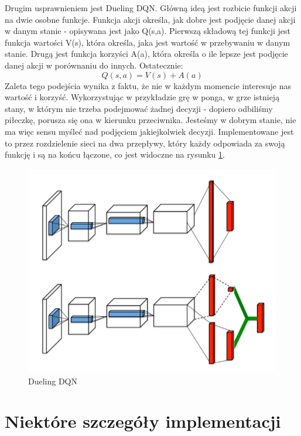 \documentclass[preprint,12pt]{elsarticle}
\begin{document}
Drugim usprawnieniem jest Dueling DQN\cite{Dueling:2016}. Główną ideą jest rozbicie funkcji akcji na dwie osobne funkcje. Funkcja akcji określa, jak dobre jest podjęcie danej akcji w danym stanie - opisywana jest jako Q(s,a). Pierwszą składową tej funkcji jest funkcja wartości V(s), która określa, jaka jest wartość w przebywaniu w danym stanie. Drugą jest funkcja korzyści A(a), która określa o ile lepsze jest podjęcie danej akcji w porównaniu do innych. Ostatecznie:
\begin{equation}
\label{q2}
Q(s,a) = V(s) + A(a)
\end{equation}
Zaleta tego podejścia wynika z faktu, że nie w każdym momencie interesuje nas wartość i korzyść. Wykorzystując w przykładzie grę w ponga, w grze istnieją stany, w którym nie trzeba podejmować żadnej decyzji - dopiero odbiliśmy piłeczkę, porusza się ona w kierunku przeciwnika. Jesteśmy w dobrym stanie, nie ma więc sensu myśleć nad podjęciem jakiejkolwiek decyzji. Implementowane jest to przez rozdzielenie sieci na dwa przepływy, który każdy odpowiada za swoją funkcję i są na końcu łączone, co jest widoczne na rysunku \ref{dueling}.
\begin{figure}[h]
\centering\includegraphics[width=1\linewidth]{dueling.png}
\caption{Dueling DQN}
\label{dueling}
\end{figure}

\section{Niektóre szczegóły implementacji}
\end{document}

